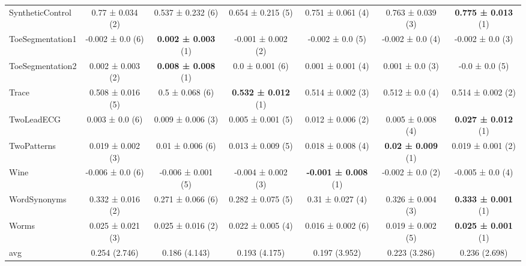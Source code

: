 \begin{table}[ht]
\begin{adjustbox}{width=\textwidth}
\begin{tabular}{lcccccc}
    SyntheticControl & 0.77 ± 0.034 (2) & 0.537 ± 0.232 (6) & 0.654 ± 0.215 (5) & 0.751 ± 0.061 (4) & 0.763 ± 0.039 (3) & \textbf{0.775 ± 0.013} (1) \\
    ToeSegmentation1 & -0.002 ± 0.0 (6) & \textbf{0.002 ± 0.003} (1) & -0.001 ± 0.002 (2) & -0.002 ± 0.0 (5) & -0.002 ± 0.0 (4) & -0.002 ± 0.0 (3) \\
    ToeSegmentation2 & 0.002 ± 0.003 (2) & \textbf{0.008 ± 0.008} (1) & 0.0 ± 0.001 (6) & 0.001 ± 0.001 (4) & 0.001 ± 0.0 (3) & -0.0 ± 0.0 (5) \\
    Trace & 0.508 ± 0.016 (5) & 0.5 ± 0.068 (6) & \textbf{0.532 ± 0.012} (1) & 0.514 ± 0.002 (3) & 0.512 ± 0.0 (4) & 0.514 ± 0.002 (2) \\
    TwoLeadECG & 0.003 ± 0.0 (6) & 0.009 ± 0.006 (3) & 0.005 ± 0.001 (5) & 0.012 ± 0.006 (2) & 0.005 ± 0.008 (4) & \textbf{0.027 ± 0.012} (1) \\
    TwoPatterns & 0.019 ± 0.002 (3) & 0.01 ± 0.006 (6) & 0.013 ± 0.009 (5) & 0.018 ± 0.008 (4) & \textbf{0.02 ± 0.009} (1) & 0.019 ± 0.001 (2) \\
    Wine & -0.006 ± 0.0 (6) & -0.006 ± 0.001 (5) & -0.004 ± 0.002 (3) & \textbf{-0.001 ± 0.008} (1) & -0.002 ± 0.0 (2) & -0.005 ± 0.0 (4) \\
    WordSynonyms & 0.332 ± 0.016 (2) & 0.271 ± 0.066 (6) & 0.282 ± 0.075 (5) & 0.31 ± 0.027 (4) & 0.326 ± 0.004 (3) & \textbf{0.333 ± 0.001} (1) \\
    Worms & 0.025 ± 0.021 (3) & 0.025 ± 0.016 (2) & 0.022 ± 0.005 (4) & 0.016 ± 0.002 (6) & 0.019 ± 0.002 (5) & \textbf{0.025 ± 0.001} (1) \\
    \hline 
    avg & 0.254 (2.746) & 0.186 (4.143) & 0.193 (4.175) & 0.197 (3.952) & 0.223 (3.286) & 0.236 (2.698) \\ 
    \hline
    \end{tabular}
    \end{adjustbox}
    \end{table}
    
    
    

